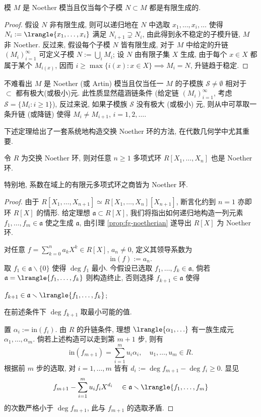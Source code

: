 \begin{lemma}\label{prop:fg-noetherian}
	模 $M$ 是 Noether 模当且仅当每个子模 $N \subset M$ 都是有限生成的.
\end{lemma}
\begin{proof}
	假设 $N$ 非有限生成, 则可以递归地在 $N$ 中选取 $x_1, \ldots, x_i, \ldots$ 使得 $N_i := \lrangle{x_1, \ldots, x_i}$ 满足 $N_{i+1} \supsetneq N_i$, 由此得到永不稳定的子模升链, $M$ 非 Noether. 反过来, 假设每个子模 $N$ 皆有限生成, 对于 $M$ 中给定的升链 $(M_i)_{i=1}^\infty$ 可定义子模 $N := \bigcup_i M_i$; 设 $N$ 由有限子集 $X$ 生成, 由于每个 $x \in X$ 都属于某个 $M_{i(x)}$, 因而 $i \geq \max\{i(x) : x \in X\} \implies M_i = N$, 升链趋于稳定.
\end{proof}

\begin{remark}\label{rem:noetherian-mod-S}
	不难看出 $M$ 是 Noether (或 Artin) 模当且仅当任一 $M$ 的子模族 $\mathcal{S} \neq \emptyset$ 相对于 $\subset$ 都有极大(或极小)元. 此性质显然蕴涵链条件 (给定链 $(M_i)_{i=1}^\infty$, 考虑 $\mathcal{S} = \{M_i : i \geq 1 \}$), 反过来说, 如果子模族 $\mathcal{S}$ 没有极大 (或极小) 元, 则从中可萃取一条升链 (或降链) 使得 $M_i \neq M_{i+1}$, $i=1,2, \ldots$.
\end{remark}

下述定理给出了一套系统地构造交换 Noether 环的方法, 在代数几何学中尤其重要.
\begin{theorem}
	令 $R$ 为交换 Noether 环, 则对任意 $n \geq 1$ 多项式环 $R[X_1, \ldots, X_n]$ 也是 Noether 环.
\end{theorem}
特别地, 系数在域上的有限元多项式环之商皆为 Noether 环.
\begin{proof}
	由于 $R[X_1, \ldots, X_{n+1}] \simeq R[X_1, \ldots, X_n][X_{n+1}]$, 断言化约到 $n=1$ 亦即环 $R[X]$ 的情形. 给定理想 $\mathfrak{a} \subset R[X]$, 我们将指出如何递归地构造一列元素 $f_1, \ldots, f_m \in \mathfrak{a}$ 使之生成 $\mathfrak{a}$, 由引理 \ref{prop:fg-noetherian} 遂导出 $R[X]$ 为 Noether 环.

	对任意 $f = \sum_{k=0}^n a_k X^k \in R[X]$, $a_n \neq 0$, 定义其领导系数为
	\[ \text{in}(f) := a_n. \]
	取 $f_1 \in \mathfrak{a} \smallsetminus \{0\}$ 使得 $\deg f_1$ 最小. 今假设已选取 $f_1, \ldots, f_k \in \mathfrak{a}$, 倘若 $\mathfrak{a} = \lrangle{f_1, \ldots, f_k}$ 则构造终止, 否则选择 $f_{k+1} \in \mathfrak{a}$ 使得
	\begin{inparaenum}[(i)]
		\item $f_{k+1} \in \mathfrak{a} \smallsetminus \lrangle{f_1, \ldots, f_k}$;
		\item 在前述条件下 $\deg f_{k+1}$ 取最小可能的值.
	\end{inparaenum}
	置 $\alpha_i := \text{in}(f_i)$. 由 $R$ 的升链条件, 理想 $\lrangle{\alpha_1, \ldots}$ 有一族生成元 $\alpha_1, \ldots, \alpha_m$. 倘若上述构造可以走到第 $m+1$ 步, 则有
	\[ \text{in}(f_{m+1}) = \sum_{i=1}^m u_i \alpha_i, \quad u_1, \ldots, u_m \in R. \]
	根据前 $m$ 步的选取, 对 $i = 1, \ldots, m$ 皆有 $d_i := \deg f_{m+1} - \deg f_i \geq 0$. 显见
	\[ f_{m+1} - \sum_{i=1}^m u_i f_i X^{d_i} \quad \in \mathfrak{a} \smallsetminus \lrangle{f_1, \ldots, f_m} \]
	的次数严格小于 $\deg f_{m+1}$, 此与 $f_{m+1}$ 的选取矛盾.
\end{proof}

